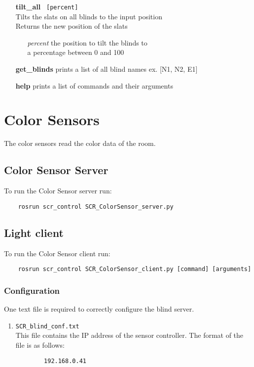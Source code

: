 \documentclass[twoside]{article}
\begin{document}
\begin{enumerate}
		\item[\bf tilt\_all]\verb| [percent]|\\
		Tilts the slats on all blinds to the input position\\
		Returns the new position of the slats
		
		\begin{enumerate}[leftmargin=3\parindent]
			\item[\it percent] the position to tilt the blinds to\\
			a percentage between 0 and 100
		\end{enumerate}
		
		\item[\bf get\_blinds] prints a list of all blind names ex. [N1, N2, E1]
		
		\item[\bf help] prints a list of commands and their arguments
		\end{enumerate}
	
	\section{Color Sensors}
	The color sensors read the color data of the room.
	
	\subsection{Color Sensor Server}
	To run the Color Sensor server run:
	\begin{verbatim}
	rosrun scr_control SCR_ColorSensor_server.py
	\end{verbatim}
	
	\subsection{Light client}
	To run the Color Sensor client run:
	\begin{verbatim}
	rosrun scr_control SCR_ColorSensor_client.py [command] [arguments]
	\end{verbatim}
	
	\subsubsection{Configuration}
	One text file is required to correctly configure the blind server.
	
	\begin{enumerate}
		\item \verb|SCR_blind_conf.txt|\\
		This file contains the IP address of the sensor controller. The format of the file is as follows:
		
		\begin{verbatim}
		192.168.0.41
		\end{verbatim}
	
	\end{enumerate}
	
\end{document}
